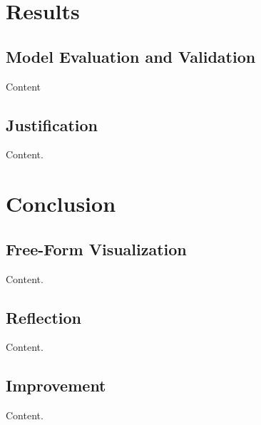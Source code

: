 \documentclass{article}
\begin{document}
\pagebreak[4]

\section{Results}

\subsection{Model Evaluation and Validation}

Content

\subsection{Justification}

Content.

\section{Conclusion}

\subsection{Free-Form Visualization}

Content.

\subsection{Reflection}

Content.

\subsection{Improvement}

Content.




\end{document}
